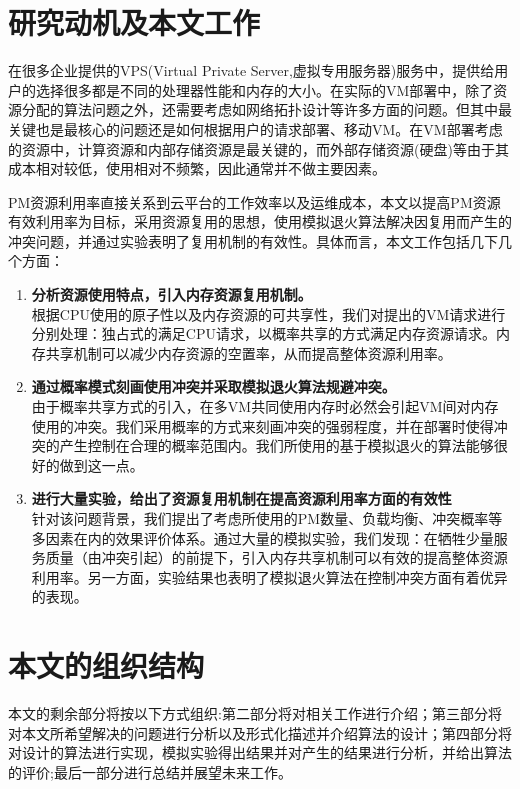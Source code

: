 \section{研究动机及本文工作}
\label{sec:concern}


在很多企业提供的VPS(Virtual Private Server,虚拟专用服务器)服务中，提供给用户的选择很多都是不同的处理器性能和内存的大小。在实际的VM部署中，除了资源分配的算法问题之外，还需要考虑如网络拓扑设计等许多方面的问题。但其中最关键也是最核心的问题还是如何根据用户的请求部署、移动VM。在VM部署考虑的资源中，计算资源和内部存储资源是最关键的，而外部存储资源(硬盘)等由于其成本相对较低，使用相对不频繁，因此通常并不做主要因素。

PM资源利用率直接关系到云平台的工作效率以及运维成本，本文以提高PM资源有效利用率为目标，采用资源复用的思想，使用模拟退火算法解决因复用而产生的冲突问题，并通过实验表明了复用机制的有效性。具体而言，本文工作包括几下几个方面：
\begin{enumerate}
\item \textbf{分析资源使用特点，引入内存资源复用机制。}\\
根据CPU使用的原子性以及内存资源的可共享性，我们对提出的VM请求进行分别处理：独占式的满足CPU请求，以概率共享的方式满足内存资源请求。内存共享机制可以减少内存资源的空置率，从而提高整体资源利用率。
\item \textbf{通过概率模式刻画使用冲突并采取模拟退火算法规避冲突。}\\
由于概率共享方式的引入，在多VM共同使用内存时必然会引起VM间对内存使用的冲突。我们采用概率的方式来刻画冲突的强弱程度，并在部署时使得冲突的产生控制在合理的概率范围内。我们所使用的基于模拟退火的算法能够很好的做到这一点。
\item \textbf{进行大量实验，给出了资源复用机制在提高资源利用率方面的有效性}\\
针对该问题背景，我们提出了考虑所使用的PM数量、负载均衡、冲突概率等多因素在内的效果评价体系。通过大量的模拟实验，我们发现：在牺牲少量服务质量（由冲突引起）的前提下，引入内存共享机制可以有效的提高整体资源利用率。另一方面，实验结果也表明了模拟退火算法在控制冲突方面有着优异的表现。
\end{enumerate}

\section{本文的组织结构}
\label{structure}


本文的剩余部分将按以下方式组织:第二部分将对相关工作进行介绍；第三部分将对本文所希望解决的问题进行分析以及形式化描述并介绍算法的设计；第四部分将对设计的算法进行实现，模拟实验得出结果并对产生的结果进行分析，并给出算法的评价;最后一部分进行总结并展望未来工作。



 


 



